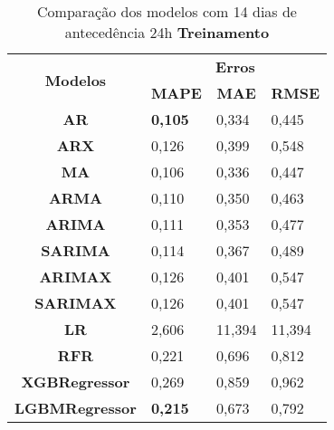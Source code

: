 \begin{table}[H]
	\centering
	\caption{Comparação dos modelos com 14 dias de antecedência 24h \textbf{Treinamento} }\label{tb:30-24trn}
	\begin{tabular}{@{}clll@{}}
		\toprule
		\multirow{2}{*}{\textbf{Modelos}} & \multicolumn{3}{c}{\textbf{Erros}}                                                                       \\ \cmidrule(l){2-4} 
		& \multicolumn{1}{c}{\textbf{MAPE}} & \multicolumn{1}{c}{\textbf{MAE}} & \multicolumn{1}{c}{\textbf{RMSE}} \\ \hline
\textbf{AR}                       &\textbf{ 0,105}                             & 0,334                            & 0,445                             \\
\textbf{ARX}                      & 0,126                             & 0,399                            & 0,548                             \\
\textbf{MA}                       & 0,106                             & 0,336                            & 0,447                             \\
\textbf{ARMA}                     & 0,110                             & 0,350                            & 0,463                             \\
\textbf{ARIMA}                    & 0,111                             & 0,353                            & 0,477                             \\
\textbf{SARIMA}                   & 0,114                             & 0,367                            & 0,489                             \\
\textbf{ARIMAX}                   & 0,126                             & 0,401                            & 0,547                             \\
\textbf{SARIMAX}                  & 0,126                             & 0,401                            & 0,547                             \\
\textbf{LR}                       & 2,606                             & 11,394                           & 11,394                            \\
\textbf{RFR}                      & 0,221                             & 0,696                            & 0,812                             \\
\textbf{XGBRegressor}             & 0,269                             & 0,859                            & 0,962                             \\
\textbf{LGBMRegressor}            & \textbf{0,215}                             & 0,673                            & 0,792                             \\ \bottomrule
	\end{tabular}

\end{table}


